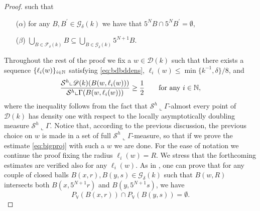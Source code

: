 \documentclass[10pt, a4paper,
oneside, headinclude,footinclude]{scrartcl}
\begin{document}
\begin{proof}
such that
\begin{itemize}
    \item[($\alpha$)] for any $B,B^\prime\in\mathscr{G}_\delta(k)$ we have that $5^NB\cap 5^NB^\prime=\emptyset$,
    \item[($\beta$)] $\bigcup_{B\in\mathscr{F}_\delta(k)} B\subseteq \bigcup_{B\in\mathscr{G}_\delta(k)} 5^{N+1}B$.
\end{itemize}
Throughout the rest of the proof we fix a $w\in \mathscr{D}(k)$ such that there exists a sequence $\{\ell_i(w)\}_{i\in\mathbb{N}}$ satisfying \eqref{eq:bdbddens}, $\ell_i(w)\leq \min\{k^{-1},\delta\}/8$, and
\begin{equation}\label{eqn:RequirementsOnR}
\frac{\mathcal{S}^{h}\llcorner \mathscr{D}(k)(B(w,\ell_i(w)))}{\mathcal{S}^{h}\llcorner \Gamma(B(w,\ell_i(w)))}\geq \frac{1}{2}\qquad\text{for any }i\in\mathbb{N},
\end{equation}
where the inequality follows from the fact that $\mathcal{S}^h\llcorner \Gamma$-almost every point of $\mathscr{D}(k)$ has density one with respect to the locally asymptotically doubling measure $\mathcal{S}^h\llcorner \Gamma$. Notice that, according to the previous discussion, the previous choice on $w$ is made in a set of full $\mathcal{S}^h\llcorner\Gamma$-measure, so that if we prove the estimate \eqref{eq:bigproj} with such a $w$ we are done.
For the ease of notation we continue the proof fixing the radius $\ell_i(w)=R$. We stress that the forthcoming estimates are verified also for any $\ell_i(w)$. 
As in \cite[Proposition 4.6]{antonelli2020rectifiable}, one can prove that for any couple of closed balls $B(x,r),B(y,s)\in \mathscr{G}_\delta(k)$ such that $B(w,R)$ intersects both $B(x,5^{N+1}r)$ and $B(y,5^{N+1}s)$, we have
\begin{equation}
    P_\mathbb{V}(B(x,r))\cap P_{\mathbb{V}}(B(y,s))=\emptyset.
    \label{eq:palle}
\end{equation}


\end{proof}
\end{document}
